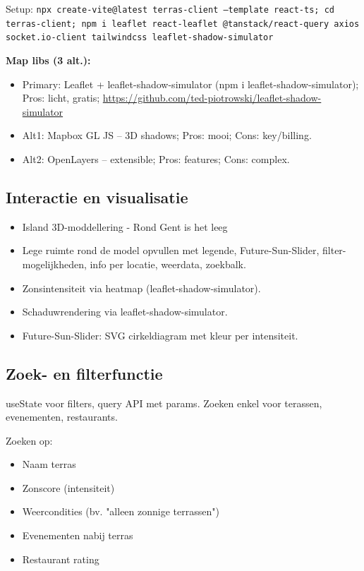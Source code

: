 \documentclass{article}
\begin{document}
Setup: \texttt{npx create-vite@latest terras-client --template react-ts; cd terras-client; npm i leaflet react-leaflet @tanstack/react-query axios socket.io-client tailwindcss leaflet-shadow-simulator}

\textbf{Map libs (3 alt.):}
\begin{itemize}
    \item Primary: Leaflet + leaflet-shadow-simulator (npm i leaflet-shadow-simulator); Pros: licht, gratis; \url{https://github.com/ted-piotrowski/leaflet-shadow-simulator}\cite{web:25}
    \item Alt1: Mapbox GL JS -- 3D shadows; Pros: mooi; Cons: key/billing.
    \item Alt2: OpenLayers -- extensible; Pros: features; Cons: complex.
\end{itemize}

\subsection{Interactie en visualisatie}
\begin{itemize}
    \item Island 3D-moddellering - Rond Gent is het leeg
    \item Lege ruimte rond de model opvullen met legende, Future-Sun-Slider, filter-mogelijkheden, info per locatie, weerdata, zoekbalk.
    \item Zonsintensiteit via heatmap (leaflet-shadow-simulator).
    \item Schaduwrendering via leaflet-shadow-simulator.
    \item Future-Sun-Slider: SVG cirkeldiagram met kleur per intensiteit.
\end{itemize}

\subsection{Zoek- en filterfunctie}
useState voor filters, query API met params.
Zoeken enkel voor terassen, evenementen, restaurants.

Zoeken op:
\begin{itemize}
    \item Naam terras
    \item Zonscore (intensiteit)
    \item Weercondities (bv. "alleen zonnige terrassen")
    \item Evenementen nabij terras
    \item Restaurant rating
\end{itemize}
\end{document}
